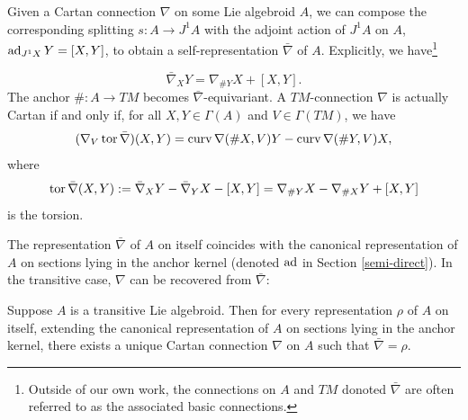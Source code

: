 \documentclass[leqno,12pt]{amsart} %
\begin{document}
Given a Cartan connection $\nabla $ on some Lie algebroid $A$, we can compose the
corresponding splitting $s \colon A \rightarrow J^1 A$ with the adjoint action of $J^1 A$
on $ A$, $\operatorname{ad}_{J^1X}Y = [X, Y]$, to obtain a self-representation $\bar \nabla $ of
$A$. Explicitly, we have\footnote{Outside of our own work, the connections on $A$ and $TM$
  donoted $\bar\nabla$ are often referred to as the associated {\df basic connections}.}

\begin{equation}
 \bar\nabla_XY = \nabla_{\#Y}X +[X, Y].\label{zero}
\end{equation}
The anchor $\# \colon A \rightarrow TM$ becomes $\bar\nabla$-equivariant. A
$TM$-connection $\nabla $ is actually Cartan if and only if, for all $X, Y \in \Gamma(A)$
and $V \in \Gamma(TM)$, we have
\begin{equation}
  (\nabla_V\operatorname{tor} \bar\nabla)(X,Y) =
 \operatorname{curv} \nabla (\#X, V)Y -  \operatorname{curv} \nabla (\#Y, V) X,
\end{equation}
where
\begin{equation*}
  \operatorname{tor} \bar\nabla (X, Y) := \bar\nabla_XY - \bar\nabla_YX - [X, Y] =
  \nabla_{\#Y}X - \nabla_{\#X}Y + [X, Y]
\end{equation*}
is the {\df torsion}.

The representation $\bar\nabla$ of $A$ on itself coincides with the canonical
representation of $A$ on sections lying in the anchor kernel (denoted $\operatorname{ad}$ in
Section \ref{semi-direct}). In the transitive case, $\nabla $ can be recovered from
$\bar\nabla $:

\begin{proposition}
  Suppose $A $ is a transitive Lie algebroid. Then for every representation $\rho $ of
  $A $ on itself, extending the canonical representation of $A$ on sections lying in the
  anchor kernel, there exists a unique Cartan connection $\nabla $ on $A$ such that
  $\bar \nabla = \rho $.
\end{proposition}
\end{document}
